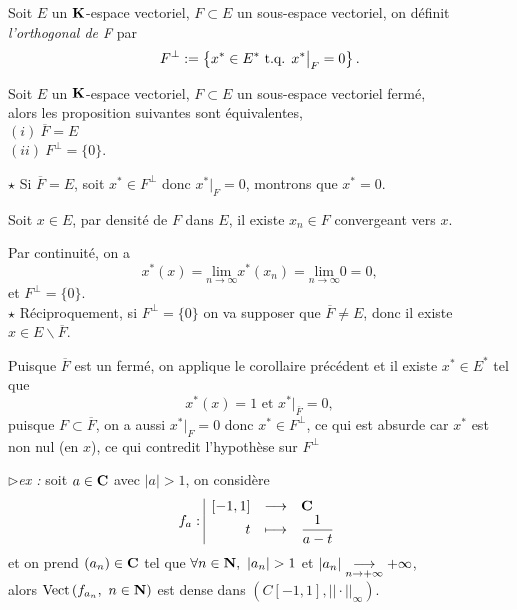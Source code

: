 \documentclass[a4paper,11pt, twoside]{article}
\begin{document}
\begin{Def}
  Soit $E$ un $\mathbf K$-espace vectoriel, $F\subset E$ un sous-espace vectoriel, on définit \emph{l'orthogonal de F} par 
  $$F^\bot:=\left\{x^*\in E^*\text{ t.q. } x^*\big|_F=0\right\}.$$
\end{Def}


\begin{corollaire}
  Soit $E$ un $\mathbf K$-espace vectoriel, $F\subset E$ un sous-espace vectoriel fermé,\\

  alors les proposition suivantes sont équivalentes,\\
  $(i)\ \overline{F}=E$\\
  $(ii)\ F^\bot=\{0\}$.
\end{corollaire}


\begin{Proof}
  $\star$ Si $\overline F=E$, soit $x^*\in F^\bot$ donc $x^*\big|_F=0$, montrons que $x^*=0$. 
  
  Soit $x\in E$, par densité de $F$ dans $E$, il existe $x_n\in F$ convergeant vers $x$. 
  
  Par continuité, on a 
  $$x^*(x)=\underset{n\to\infty}{\mathrm{lim}}x^*(x_n)=\underset{n\to\infty}{\mathrm{lim}} 0=0,$$
  et $F^\bot=\{0\}$.\\

  $\star$ Réciproquement, si $F^\bot=\{0\}$ on va supposer que $\overline F\neq E$, donc il existe $x\in E\backslash\overline{F}$.
  
  Puisque $\overline{F}$ est un fermé, on applique le corollaire précédent et il existe $x^*\in E^*$ tel que 
  $$x^*(x)=1\text{ et }x^*\big|_{\overline{F}}=0,$$
  puisque $F\subset\overline{F}$, on a aussi $x^*\big|_{{F}}=0$ donc $x^*\in F^\bot$, ce qui est absurde car $x^*$ est non nul (en $x$), ce qui contredit l'hypothèse sur $F^\bot$
\end{Proof}


$\triangleright$\emph{ex :} soit $a\in\mathbf C$ avec $|a|>1$, on considère
$$f_a:\begin{array}{|rcl}
  [-1,1]&\longrightarrow&\mathbf C\\
  t&\longmapsto&\displaystyle\frac{1}{a-t}
\end{array}$$
et on prend $(a_n)\in \mathbf C$ tel que $\forall n\in\N,\ |a_n|>1$ et $|a_n|\underset{n\to+\infty}{\longrightarrow} +\infty$,\\

alors $\mathrm{Vect}\left(f_{a_n},\ n\in\N\right)$ est dense dans $\left(C[-1,1],||\cdot||_\infty\right)$.
\end{document}
